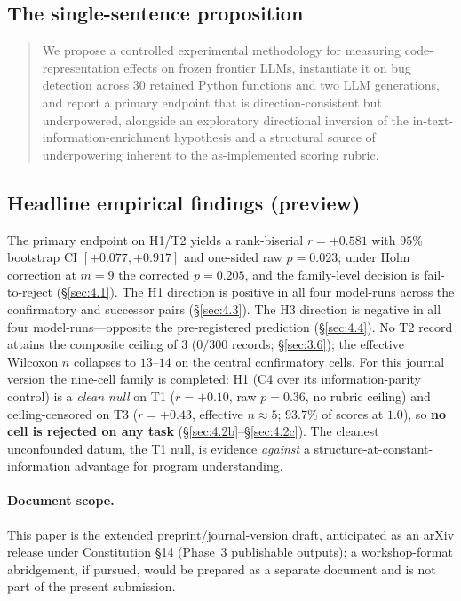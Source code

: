 \documentclass[11pt]{article}
\begin{document}
\subsection{The single-sentence proposition}
\label{sec:1.4}
\begin{quote}
We propose a controlled experimental methodology for measuring
code-representation effects on frozen frontier LLMs, instantiate it on bug
detection across 30 retained Python functions and two LLM generations, and
report a primary endpoint that is direction-consistent but underpowered,
alongside an exploratory directional inversion of the
in-text-information-enrichment hypothesis and a structural source of
underpowering inherent to the as-implemented scoring rubric.
\end{quote}

\subsection{Headline empirical findings (preview)}
\label{sec:1.5}
The primary endpoint on H1/T2 yields a rank-biserial
$r = +0.581$ with $95\%$ bootstrap CI $[+0.077, +0.917]$ and
one-sided raw $p = 0.023$; under Holm correction at $m = 9$ the
corrected $p = 0.205$, and the family-level decision is
fail-to-reject (\S\ref{sec:4.1}). The H1 direction is positive
in all four model-runs across the confirmatory and successor
pairs (\S\ref{sec:4.3}). The H3 direction is negative in all four
model-runs---opposite the pre-registered prediction
(\S\ref{sec:4.4}). No T2 record attains the composite ceiling of
$3$ ($0/300$ records; \S\ref{sec:3.6}); the effective Wilcoxon
$n$ collapses to $13$--$14$ on the central confirmatory cells.
For this journal version the nine-cell family is completed: H1
(C4 over its information-parity control) is a \emph{clean null} on T1
($r = +0.10$, raw $p = 0.36$, no rubric ceiling) and ceiling-censored on
T3 ($r = +0.43$, effective $n \approx 5$; $93.7\%$ of scores at $1.0$),
so \textbf{no cell is rejected on any task}
(\S\ref{sec:4.2b}--\S\ref{sec:4.2c}). The cleanest unconfounded datum, the
T1 null, is evidence \emph{against} a structure-at-constant-information
advantage for program understanding.

\paragraph{Document scope.} This paper is the extended
preprint/journal-version draft, anticipated as an arXiv release
under Constitution \S14 (Phase~3 publishable outputs); a
workshop-format abridgement, if pursued, would be prepared as a
separate document and is not part of the present submission.
\end{document}
